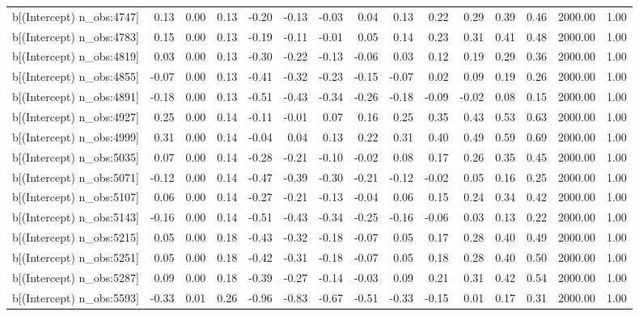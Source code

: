 \begin{table}[ht]
\begin{tabular}{rrrrrrrrrrrrrrr}
  b[(Intercept) n\_obs:4747] & 0.13 & 0.00 & 0.13 & -0.20 & -0.13 & -0.03 & 0.04 & 0.13 & 0.22 & 0.29 & 0.39 & 0.46 & 2000.00 & 1.00 \\ 
  b[(Intercept) n\_obs:4783] & 0.15 & 0.00 & 0.13 & -0.19 & -0.11 & -0.01 & 0.05 & 0.14 & 0.23 & 0.31 & 0.41 & 0.48 & 2000.00 & 1.00 \\ 
  b[(Intercept) n\_obs:4819] & 0.03 & 0.00 & 0.13 & -0.30 & -0.22 & -0.13 & -0.06 & 0.03 & 0.12 & 0.19 & 0.29 & 0.36 & 2000.00 & 1.00 \\ 
  b[(Intercept) n\_obs:4855] & -0.07 & 0.00 & 0.13 & -0.41 & -0.32 & -0.23 & -0.15 & -0.07 & 0.02 & 0.09 & 0.19 & 0.26 & 2000.00 & 1.00 \\ 
  b[(Intercept) n\_obs:4891] & -0.18 & 0.00 & 0.13 & -0.51 & -0.43 & -0.34 & -0.26 & -0.18 & -0.09 & -0.02 & 0.08 & 0.15 & 2000.00 & 1.00 \\ 
  b[(Intercept) n\_obs:4927] & 0.25 & 0.00 & 0.14 & -0.11 & -0.01 & 0.07 & 0.16 & 0.25 & 0.35 & 0.43 & 0.53 & 0.63 & 2000.00 & 1.00 \\ 
  b[(Intercept) n\_obs:4999] & 0.31 & 0.00 & 0.14 & -0.04 & 0.04 & 0.13 & 0.22 & 0.31 & 0.40 & 0.49 & 0.59 & 0.69 & 2000.00 & 1.00 \\ 
  b[(Intercept) n\_obs:5035] & 0.07 & 0.00 & 0.14 & -0.28 & -0.21 & -0.10 & -0.02 & 0.08 & 0.17 & 0.26 & 0.35 & 0.45 & 2000.00 & 1.00 \\ 
  b[(Intercept) n\_obs:5071] & -0.12 & 0.00 & 0.14 & -0.47 & -0.39 & -0.30 & -0.21 & -0.12 & -0.02 & 0.05 & 0.16 & 0.25 & 2000.00 & 1.00 \\ 
  b[(Intercept) n\_obs:5107] & 0.06 & 0.00 & 0.14 & -0.27 & -0.21 & -0.13 & -0.04 & 0.06 & 0.15 & 0.24 & 0.34 & 0.42 & 2000.00 & 1.00 \\ 
  b[(Intercept) n\_obs:5143] & -0.16 & 0.00 & 0.14 & -0.51 & -0.43 & -0.34 & -0.25 & -0.16 & -0.06 & 0.03 & 0.13 & 0.22 & 2000.00 & 1.00 \\ 
  b[(Intercept) n\_obs:5215] & 0.05 & 0.00 & 0.18 & -0.43 & -0.32 & -0.18 & -0.07 & 0.05 & 0.17 & 0.28 & 0.40 & 0.49 & 2000.00 & 1.00 \\ 
  b[(Intercept) n\_obs:5251] & 0.05 & 0.00 & 0.18 & -0.42 & -0.31 & -0.18 & -0.07 & 0.05 & 0.18 & 0.28 & 0.40 & 0.50 & 2000.00 & 1.00 \\ 
  b[(Intercept) n\_obs:5287] & 0.09 & 0.00 & 0.18 & -0.39 & -0.27 & -0.14 & -0.03 & 0.09 & 0.21 & 0.31 & 0.42 & 0.54 & 2000.00 & 1.00 \\ 
  b[(Intercept) n\_obs:5593] & -0.33 & 0.01 & 0.26 & -0.96 & -0.83 & -0.67 & -0.51 & -0.33 & -0.15 & 0.01 & 0.17 & 0.31 & 2000.00 & 1.00 \\ 

\end{tabular}
\end{table}

